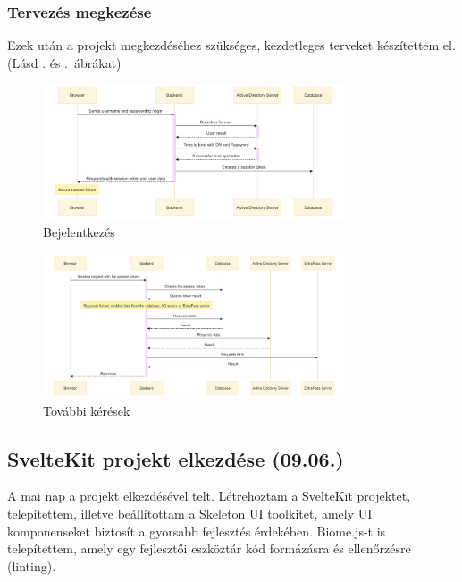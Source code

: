 \documentclass[a4paper]{article}
\begin{document}
\subsubsection*{Tervezés megkezése}
Ezek után a projekt megkezdéséhez szükséges, kezdetleges terveket készítettem el.
(Lásd . és .~ábrákat)\\

\begin{figure}[ht]
  \centering
  \includegraphics[width = 0.8\textwidth]{images/login_diagram.png}
  \caption{Bejelentkezés}
  \label{fig:login_diagram}
\end{figure}
\begin{center}
\end{center}

\begin{figure}[ht]
  \centering
  \includegraphics[width = 0.8\textwidth]{images/further_requests_diagram.png}
  \caption{További kérések}
  \label{fig:further_requests_diagram}
\end{figure}
\begin{center}
\end{center}

\subsection{SvelteKit projekt elkezdése (09.06.)}

A mai nap a projekt elkezdésével telt. Létrehoztam a SvelteKit projektet, telepítettem, illetve
beállítottam a Skeleton UI toolkitet, amely UI komponenseket biztosít a gyorsabb fejlesztés
érdekében. Biome.js-t is telepítettem, amely egy fejlesztői eszköztár kód formázásra és ellenőrzésre
(linting).\\
\end{document}
